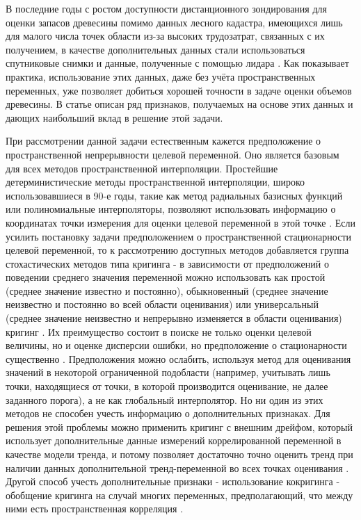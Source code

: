 \documentclass{article}
\begin{document}
В последние годы с ростом доступности дистанционного зондирования для оценки запасов древесины помимо данных лесного кадастра, имеющихся лишь для малого числа точек области из-за высоких трудозатрат, связанных с их получением, в качестве дополнительных данных стали использоваться спутниковые снимки и данные, полученные с помощью лидара \citep{maack2016modelling}. Как показывает практика, использование этих данных, даже без учёта пространственных переменных, уже позволяет добиться хорошей точности в задаче оценки объемов древесины. В статье \cite{sanchez2019growing} описан ряд признаков, получаемых на основе этих данных и дающих наибольший вклад в решение этой задачи.

При рассмотрении данной задачи естественным кажется предположение о пространственной непрерывности целевой переменной. Оно является базовым для всех методов пространственной интерполяции. Простейшие детерминистические методы пространственной интерполяции, широко использовавшиеся в 90-е годы, такие как метод радиальных базисных функций или полиномиальные интерполяторы, позволяют использовать информацию о координатах точки измерения для оценки целевой переменной в этой точке \citep{kanushin2023review}. Если усилить постановку задачи предположением о пространственной стационарности целевой переменной, то к рассмотрению доступных методов добавляется группа стохастических методов типа кригинга - в зависимости от предположений о поведении среднего значения переменной можно использовать как простой (среднее значение известно и постоянно), обыкновенный (среднее значение неизвестно и постоянно во всей области оценивания) или универсальный (среднее значение неизвестно и непрерывно изменяется в области оценивания) кригинг \citep{geostatics_book}. Их преимущество состоит в поиске не только оценки целевой величины, но и оценке дисперсии ошибки, но предположение о стационарности существенно \citep{krukova2018spatialinterpolation}. Предположения можно ослабить, используя метод для оценивания значений в некоторой ограниченной подобласти (например, учитывать лишь точки, находящиеся от точки, в которой производится оценивание, не далее заданного порога), а не как глобальный интерполятор. Но ни один из этих методов не способен учесть информацию о дополнительных признаках. Для решения этой проблемы можно применить кригинг с внешним дрейфом, который использует дополнительные данные измерений коррелированной переменной в качестве модели тренда, и потому позволяет достаточно точно оценить тренд при наличии данных дополнительной тренд-переменной во всех точках оценивания \citep{hudson1994mapping}. Другой способ учесть дополнительные признаки - использование кокригинга - обобщение кригинга на случай многих переменных, предполагающий, что между ними есть пространственная корреляция \cite{wackernagel1995multivariate}.
\end{document}
